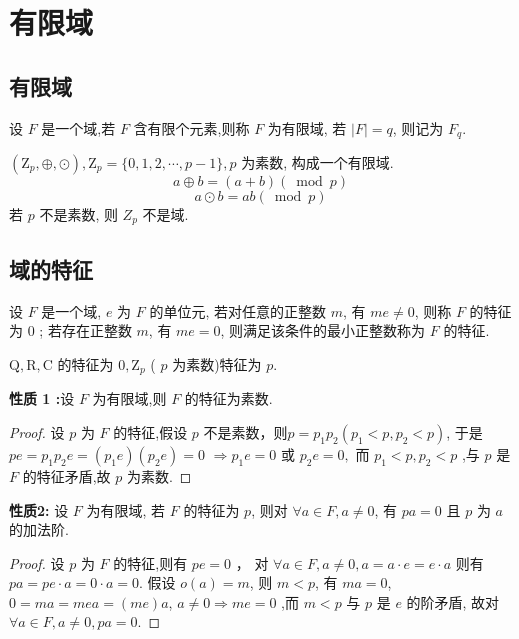\section{有限域}
\subsection{有限域}
\begin{definition}
    设 $ F $ 是一个域,若 $ F $ 含有限个元素,则称 $ F $ 为有限域, 若 $ |F|=q $, 则记为 $ F_{q} $.
\end{definition}
\begin{example}
    $ \left(\mathrm{Z}_{p}, \oplus, \odot\right), \mathrm{Z}_{p}=\{0,1,2, \cdots, p-1\}, p $ 为素数, 构成一个有限域.
$$ a \oplus b=(a+b)(\bmod p) $$
$$ a \odot b=a b(\bmod p) $$
若 $ p $ 不是素数, 则 $ Z_{p} $ 不是域.
\end{example}
\subsection{域的特征}
\begin{definition}
    设 $ F $ 是一个域, $ e $ 为 $ F $ 的单位元, 若对任意的正整数 $ m $, 有 $ m e \neq 0 $, 则称 $ F $ 的特征为 0 ; 若存在正整数 $ m $, 有 $ m e=0 $, 则满足该条件的最小正整数称为 $ F $ 的特征.
\end{definition}
\begin{example}
    $ \mathrm{Q}, \mathrm{R}, \mathrm{C} $ 的特征为 $ 0, \mathrm{Z}_{p} $ ( $ p $ 为素数)特征为 $ p $.
\end{example}

\textbf{性质 1 :}设 $ F $ 为有限域,则 $ F $ 的特征为素数.
\begin{proof}
    设 $ p $ 为 $ F $ 的特征,假设 $ p $ 不是素数，则$p=p_{1} p_{2}\left(p_{1}<p, p_{2}<p\right)$, 于是$ p e=p_{1} p_{2} e=\left(p_{1} e\right)\left(p_{2} e\right)=0 $ $\Rightarrow p_{1} e=0 \text { 或 } p_{2} e=0, \text { 而 } p_{1}<p, p_{2}<p$
,与 $ p $ 是 $ F $ 的特征矛盾,故 $ p $ 为素数.
\end{proof}


\textbf{性质2: }设 $ F $ 为有限域, 若 $ F $ 的特征为 $ p $, 则对 $ \forall a \in F, a \neq 0 $,
有 $ p a=0 $ 且 $ p $ 为 $ a $ 的加法阶.

\begin{proof}
    设 $ p $ 为 $ F $ 的特征,则有 $ p e=0 $ ，
对 $ \forall a \in F, a \neq 0, a=a \cdot e=e \cdot a $
则有 $ p a=p e \cdot a=0 \cdot a=0 $.
假设 $ o(a)=m $, 则 $ m<p $, 有 $ m a=0 $, 
$ 0=m a=m e a=(m e) a $, $ a \neq 0 \Rightarrow m e=0 $ ,而 $ m<p $ 与 $ p $ 是 $ e $ 的阶矛盾,
故对 $ \forall a \in F, a \neq 0, p a=0 $.
\end{proof}

